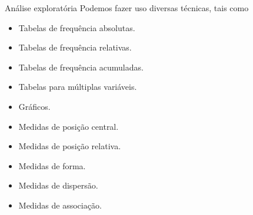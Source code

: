 \documentclass[
  ignorenonframetext,
  serif,
  professionalfont,
  usenames,
  dvipsnames,
  aspectratio = 169]{beamer}
\providecommand{\tightlist}{%
  \setlength{\itemsep}{0pt}\setlength{\parskip}{0pt}}
\renewcommand{\tightlist}{%
  \setlength{\itemsep}{0\baselineskip}
  \setlength{\parskip}{0.25\baselineskip}
}
\def\beginAHalfColumn{\begin{minipage}{0.49\textwidth}}%
\def\endColumns{\end{minipage}}%
\begin{document}
\begin{frame}{Análise exploratória}
\label{anuxe1lise-exploratuxf3ria-6}
Podemos fazer uso diversas técnicas, tais como

\beginAHalfColumn

\begin{itemize}
\tightlist
\item
  Tabelas de frequência absolutas.
\item
  Tabelas de frequência relativas.
\item
  Tabelas de frequência acumuladas.
\item
  Tabelas para múltiplas variáveis.
\item
  Gráficos.
\end{itemize}

\endColumns
\beginAHalfColumn

\begin{itemize}
\tightlist
\item
  Medidas de posição central.
\item
  Medidas de posição relativa.
\item
  Medidas de forma.
\item
  Medidas de dispersão.
\item
  Medidas de associação.
\end{itemize}

\endColumns
\end{frame}
\end{document}
